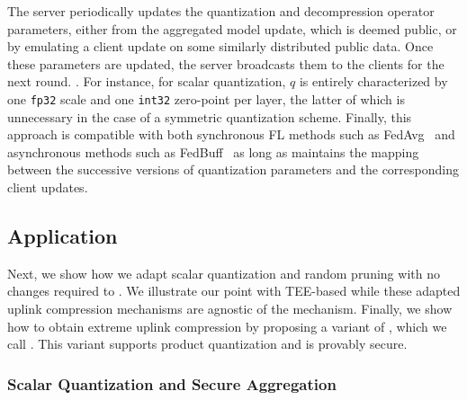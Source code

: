 The server periodically updates the quantization and decompression operator parameters, either from the aggregated model update, which is deemed public, or by emulating a client update on some similarly distributed public data. Once these parameters are updated, the server broadcasts them to the clients for the next round. . For instance, for scalar quantization, $q$ is entirely characterized by one \texttt{fp32} scale and one \texttt{int32} zero-point per layer, the latter of which is unnecessary in the case of a symmetric quantization scheme. Finally, this approach is compatible with both synchronous FL methods such as FedAvg~\citep{mcmahan2016communicationefficient} and asynchronous methods such as FedBuff~\citep{nguyen2021federated} as long as \SecAgg maintains the mapping between the successive versions of quantization parameters and the corresponding client updates.

\subsection{Application}
Next, we show how we adapt scalar quantization and random pruning with no changes required to \SecAgg. We illustrate our point with TEE-based \SecAgg while these adapted uplink compression mechanisms are agnostic of the \SecAgg mechanism. Finally, we show how to obtain extreme uplink compression by proposing a variant of \SecAgg, which we call \SecInd. This variant supports product quantization and is provably secure.

\subsubsection{Scalar Quantization and Secure Aggregation}
\label{subsubsec:sq_sa}

